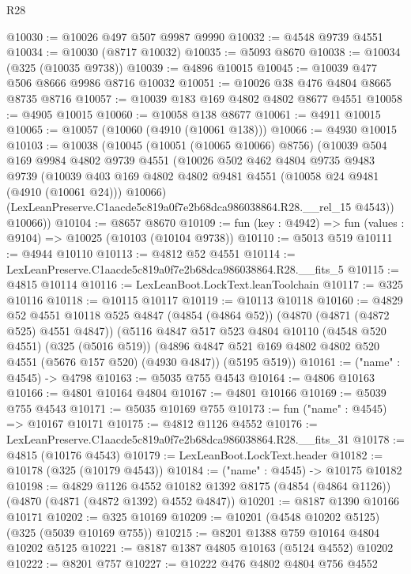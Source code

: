 \begin{lexlean}{R28}
\begin{coremodule}
@10030 := @10026 @497 @507 @9987 @9990
@10032 := @4548 @9739 @4551
@10034 := @10030 (@8717 @10032)
@10035 := @5093 @8670
@10038 := @10034 (@325 (@10035 @9738))
@10039 := @4896 @10015
@10045 := @10039 @477 @506 @8666 @9986 @8716 @10032
@10051 := @10026 @38 @476 @4804 @8665 @8735 @8716
@10057 := @10039 @183 @169 @4802 @4802 @8677 @4551
@10058 := @4905 @10015
@10060 := @10058 @138 @8677
@10061 := @4911 @10015
@10065 := @10057 (@10060 (@4910 (@10061 @138)))
@10066 := @4930 @10015
@10103 := @10038
    (@10045
      (@10051 (@10065 @10066) @8756)
      (@10039
        @504
        @169
        @9984
        @4802
        @9739
        @4551
        (@10026
          @502
          @462
          @4804
          @9735
          @9483
          @9739
          (@10039 @403 @169 @4802 @4802 @9481 @4551 (@10058 @24 @9481 (@4910 (@10061 @24))) @10066)
          (LexLeanPreserve.C1aacde5c819a0f7e2b68dca986038864.R28.__rel_15 @4543))
        @10066))
@10104 := @8657 @8670
@10109 := fun (key : @4942) => fun (values : @9104) => @10025 (@10103 (@10104 @9738))
@10110 := @5013 @519
@10111 := @4944 @10110
@10113 := @4812 @52 @4551
@10114 := LexLeanPreserve.C1aacde5c819a0f7e2b68dca986038864.R28.__fits_5
@10115 := @4815 @10114
@10116 := LexLeanBoot.LockText.leanToolchain
@10117 := @325 @10116
@10118 := @10115 @10117
@10119 := @10113 @10118
@10160 := @4829
    @52
    @4551
    @10118
    @525
    @4847
    (@4854 (@4864 @52))
    (@4870 (@4871 (@4872 @525) @4551 @4847))
    (@5116
      @4847
      @517
      @523
      @4804
      @10110
      (@4548 @520 @4551)
      (@325 (@5016 @519))
      (@4896 @4847 @521 @169 @4802 @4802 @520 @4551 (@5676 @157 @520) (@4930 @4847))
      (@5195 @519))
@10161 := ("name" : @4545) -> @4798
@10163 := @5035 @755 @4543
@10164 := @4806 @10163
@10166 := @4801 @10164 @4804
@10167 := @4801 @10166
@10169 := @5039 @755 @4543
@10171 := @5035 @10169 @755
@10173 := fun ("name" : @4545) => @10167 @10171
@10175 := @4812 @1126 @4552
@10176 := LexLeanPreserve.C1aacde5c819a0f7e2b68dca986038864.R28.__fits_31
@10178 := @4815 (@10176 @4543)
@10179 := LexLeanBoot.LockText.header
@10182 := @10178 (@325 (@10179 @4543))
@10184 := ("name" : @4545) -> @10175 @10182
@10198 := @4829
    @1126
    @4552
    @10182
    @1392
    @8175
    (@4854 (@4864 @1126))
    (@4870 (@4871 (@4872 @1392) @4552 @4847))
@10201 := @8187 @1390 @10166 @10171
@10202 := @325 @10169
@10209 := @10201 (@4548 @10202 @5125) (@325 (@5039 @10169 @755))
@10215 := @8201 @1388 @759 @10164 @4804 @10202 @5125
@10221 := @8187 @1387 @4805 @10163 (@5124 @4552) @10202
@10222 := @8201 @757
@10227 := @10222 @476 @4802 @4804 @756 @4552

\end{coremodule}
\end{lexlean}
